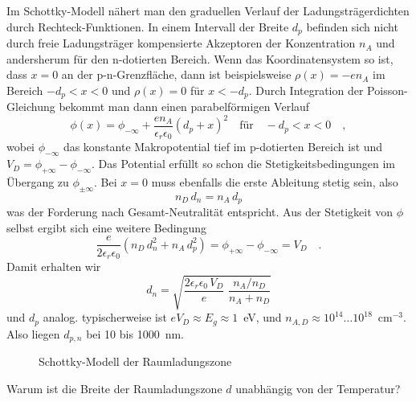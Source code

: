 Im Schottky-Modell nähert man den graduellen Verlauf der Ladungsträgerdichten durch Rechteck-Funktionen. In einem Intervall der Breite $d_p$ befinden sich nicht durch freie Ladungsträger kompensierte Akzeptoren der Konzentration $n_A$ und andersherum für den n-dotierten Bereich. Wenn das Koordinatensystem so ist, dass $x=0$ an der p-n-Grenzfläche, dann ist beispielsweise $\rho(x) = - e n_A$ im Bereich $- d_p < x < 0$ und  $\rho(x) =0$ für $x < -d_p$. Durch Integration der Poisson-Gleichung bekommt man dann einen parabelförmigen Verlauf 
\begin{equation}
    \phi(x) = \phi_{-\infty} + \frac{e n_A}{\epsilon_r \epsilon_0} \left( d_p + x \right)^2  \quad \text{für} \quad - d_p < x < 0 \quad ,
\end{equation}
wobei $\phi_{-\infty}$ das konstante Makropotential tief im p-dotierten Bereich ist und $V_D =  \phi_{+\infty} - \phi_{-\infty}$. Das Potential erfüllt so schon die Stetigkeitsbedingungen im Übergang zu $\phi_{\pm\infty}$. Bei $x=0$ muss ebenfalls die erste Ableitung  stetig sein, also
\begin{equation}
    n_D \, d_n = n_A \, d_p
\end{equation}
was der Forderung nach Gesamt-Neutralität entspricht. Aus der Stetigkeit von $\phi$ selbst ergibt sich eine weitere Bedingung
\begin{equation}
    \frac{e}{2 \epsilon_r \epsilon_0} \left(  n_D \, d_n^2  + n_A \,d_p^2 \right) =\phi_{+\infty} - \phi_{-\infty} = V_D \quad .
\end{equation}
Damit erhalten wir
\begin{equation}
    d_n = \sqrt{ \frac{{2 \epsilon_r \epsilon_0 \, V_D}}{e}   \, \, \frac{n_A / n_D}{n_A + n_D}}
\end{equation}
und $d_p$ analog. typischerweise ist $e V_D \approx E_g \approx 1 $~eV, und $n_{A,D} \approx 10^{14} \dots 10^{18}$~cm$^{-3}$. Also liegen $d_{p,n}$ bei 10 bis 1000~nm.


\begin{figure}
    \caption{Schottky-Modell der Raumladungszone}
\end{figure}

\begin{questions}
    \item Warum ist die Breite der Raumladungszone $d$ unabhängig von der Temperatur?
\end{questions}

